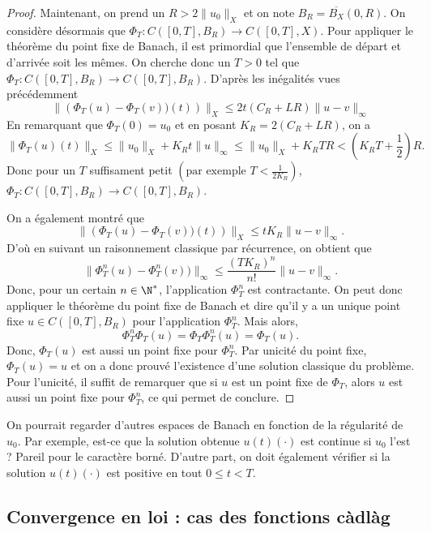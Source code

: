 \begin{proof}
	Maintenant, on prend un $R > 2\|u_0\|_X$ et on note $B_R  = \overline{B_X}(0,R)$.
	On considère désormais que $\Phi_T : C([0,T], B_R) \to C([0,T], X)$. Pour appliquer le théorème du point fixe de Banach, il est primordial que l'ensemble de départ et d'arrivée soit les mêmes. On cherche donc un $T > 0$ tel que $\Phi_T : C([0,T], B_R) \to C([0,T], B_R)$. D'après les inégalités vues précédemment
	\[
		\|\left(\Phi_T(u) - \Phi_T(v))(t)\right)\|_X \le
		2 t \left( C_{R} + L R \right)\|u-v\|_\infty
	\]
	En remarquant que $\Phi_T(0) = u_0$ et en posant $K_R = 2 \left( C_{R} + L R \right)$,
	on a
	\[
		\|\Phi_T(u)(t)\|_X \le \|u_0\|_X + K_R t \|u\|_\infty \le \|u_0\|_X + K_R T R
		< \left(K_R T + \frac{1}{2}\right) R.
	\]
	Donc pour un $T$ suffisament petit $\left(\text{par exemple } T < \frac{1}{2 K_R}\right)$, $\Phi_T : C([0,T], B_R) \to C([0,T], B_R)$.

	On a également montré que
	\[
		\|\left(\Phi_T(u) - \Phi_T(v))(t)\right)\|_X \le
		t K_R\|u-v\|_\infty.
	\]
	D'où en suivant un raisonnement classique par récurrence, on obtient que
	\[
		\|\Phi_T^n(u) - \Phi_T^n(v))\|_\infty \le
		\frac{\left(T K_R\right)^n}{n !}\|u-v\|_\infty.
	\]
	Donc, pour un certain $n \in \N^*$, l'application $\Phi_T^n$ est contractante. On peut donc appliquer le théorème du point fixe de Banach et dire qu'il y a un unique point fixe $u \in C([0,T], B_R)$ pour l'application $\Phi_T^n$. Mais alors,
	\[
		\Phi_T^{n}\Phi_T(u) = \Phi_T \Phi_T^n(u) = \Phi_T(u).
	\]
	Donc, $\Phi_T(u)$ est aussi un point fixe pour $\Phi_T^n$. Par unicité du point fixe, $\Phi_T(u) = u$ et on a donc prouvé l'existence d'une solution classique du problème. Pour l'unicité, il suffit de remarquer que si $u$ est un point fixe de $\Phi_T$, alors $u$ est aussi un point fixe pour $\Phi_T^n$, ce qui permet de conclure.
\end{proof}

\begin{rem}
	On pourrait regarder d'autres espaces de Banach en fonction de la régularité de $u_0$. Par exemple, est-ce que la solution obtenue $u(t)(\cdot)$ est continue si $u_0$ l'est ? Pareil pour le caractère borné. D'autre part, on doit également vérifier si la solution $u(t)(\cdot)$ est positive en tout $0 \le t < T$.
\end{rem}

\subsection{Convergence en loi : cas des fonctions càdlàg}

